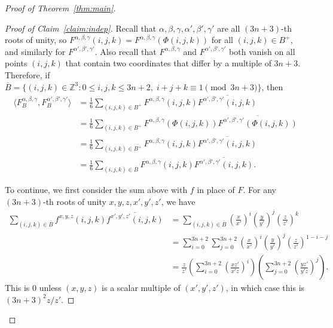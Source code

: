 \documentclass{article}
\begin{document}
\begin{proof}[Proof of Theorem~\ref{thm:main}]
\begin{proof}[Proof of Claim~\ref{claim:indep}]
Recall that $\alpha,\beta,\gamma,\alpha',\beta',\gamma'$ are all $(3n+3)$-th roots of unity, so $F^{\alpha,\beta,\gamma}(i,j,k)=F^{\alpha,\beta,\gamma}(\Phi(i,j,k))$ for all $(i,j,k)\in B^+$, and similarly for $F^{\alpha',\beta',\gamma'}$. Also recall that $F^{\alpha,\beta,\gamma}$ and $F^{\alpha',\beta',\gamma'}$ both vanish on all points $(i,j,k)$ that contain two coordinates that differ by a multiple of $3n+3$. Therefore, if $\overline{B}=\{(i,j,k)\in\mathbb{Z}^3:0\leq i,j,k\leq 3n+2,\;i+j+k\equiv1\pmod{3n+3}\}$, then
\begin{align*}
\langle F^{\alpha,\beta,\gamma}_B,F^{\alpha',\beta',\gamma'}_B\rangle&=\frac16\sum_{(i,j,k)\in B^+}F^{\alpha,\beta,\gamma}(i,j,k)\overline{F^{\alpha',\beta',\gamma'}(i,j,k)}\\
&=\frac16\sum_{(i,j,k)\in B^+}F^{\alpha,\beta,\gamma}(\Phi(i,j,k))\overline{F^{\alpha',\beta',\gamma'}(\Phi(i,j,k))}\\
&=\frac16\sum_{(i,j,k)\in\overline{B^+}}F^{\alpha,\beta,\gamma}(i,j,k)\overline{F^{\alpha',\beta',\gamma'}(i,j,k)}\\
&=\frac16\sum_{(i,j,k)\in\overline{B}}F^{\alpha,\beta,\gamma}(i,j,k)\overline{F^{\alpha',\beta',\gamma'}(i,j,k)}.
\end{align*}

To continue, we first consider the sum above with $f$ in place of $F$. For any $(3n+3)$-th roots of unity $x,y,z,x',y',z'$, we have
\begin{align*}
\sum_{(i,j,k)\in\overline{B}}f^{x,y,z}(i,j,k)\overline{f^{x',y',z'}(i,j,k)}&=\sum_{(i,j,k)\in\overline{B}}\left(\frac x{x'}\right)^i\left(\frac{y}{y'}\right)^j\left(\frac{z}{z'}\right)^k\\
&=\sum_{i=0}^{3n+2}\sum_{j=0}^{3n+2}\left(\frac x{x'}\right)^i\left(\frac{y}{y'}\right)^j\left(\frac{z}{z'}\right)^{1-i-j}\\
&=\frac z{z'}\left(\sum_{i=0}^{3n+2}\left(\frac{xz'}{x'z}\right)^{i}\right)\left(\sum_{j=0}^{3n+2}\left(\frac{yz'}{y'z}\right)^j\right).
\end{align*}
This is 0 unless $(x,y,z)$ is a scalar multiple of $(x',y',z')$, in which case this is $(3n+3)^2z/z'$.


\end{proof}
\end{proof}
\end{document}
